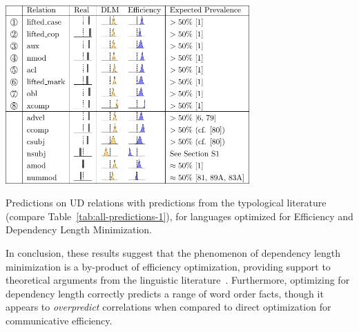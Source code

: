 \documentclass[10pt,twoside,lineno]{article}
\begin{document}
\begin{table}[ht] %
	\begin{center}	
\includegraphics[width=0.7\textwidth]{si-table-perrel-1b-1.png}
\end{center}
\caption{Predictions on UD relations with predictions from the typological literature (compare Table~\ref{tab:all-predictions-1}), for languages optimized for Efficiency and Dependency Length Minimization.
}
\label{tab:all-predictions-1b}
\end{table}




In conclusion, these results suggest that the phenomenon of dependency length minimization is a by-product of efficiency optimization, providing support to theoretical arguments from the linguistic literature~\cite{hawkins1994performance,futrell2017memory, futrell2017generalizing}.
Furthermore, optimizing for dependency length correctly predicts a range of word order facts, though it appears to \emph{overpredict} correlations when compared to direct optimization for communicative efficiency.
\end{document}

